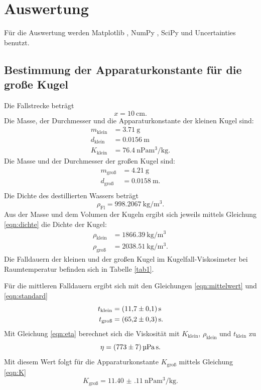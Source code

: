\section{Auswertung}
\label{sec:Auswertung}
Für die Auswertung werden Matplotlib \cite{matplotlib}, NumPy \cite{numpy}, SciPy \cite{scipy} 
und Uncertainties \cite{uncertainties} benutzt.

\subsection{Bestimmung der Apparaturkonstante für die große Kugel}
Die Fallstrecke beträgt 
\begin{equation*}
    x = \SI{10}{\centi\meter}.
\end{equation*}
Die Masse, der Durchmesser und die Apparaturkonstante der kleinen Kugel sind:
\begin{align*}
    m_\text{klein} &= \SI{3.71}{\gram} \\
    d_\text{klein} &= \SI{0.0156}{\meter} \\
    K_\text{klein} &= \SI{76.4}{\nano\pascal\cubic\meter\per\kilo\gram}.
\end{align*}
Die Masse und der Durchmesser der großen Kugel sind:
\begin{align*}
    m_\text{groß} &= \SI{4.21}{\gram} \\
    d_\text{groß} &= \SI{0.0158}{\meter}. \\
\end{align*}
Die Dichte des destillierten Wassers beträgt
\begin{equation*}
    \rho_\text{Fl} = \SI{998.2067}{\kilo\gram\per\cubic\meter}.
\end{equation*}
Aus der Masse und dem Volumen der Kugeln ergibt sich jeweils mittels Gleichung \eqref{eqn:dichte}
die Dichte der Kugel:
\begin{align*}
    \rho_\text{klein} &= \SI{1866.39}{\kilo\gram\per\cubic\meter} \\
    \rho_\text{groß} &= \SI{2038.51}{\kilo\gram\per\cubic\meter}.
\end{align*}
Die Falldauern der kleinen und der großen Kugel im Kugelfall-Viskosimeter
bei Raumtemperatur befinden sich in Tabelle \ref{tab1}.

\noindent Für die mittleren Falldauern ergibt sich mit den Gleichungen \eqref{eqn:mittelwert} 
und \eqref{eqn:standard}
\begin{align*}
    t_\text{klein} &= \SI{11.7 \pm 0.1}{\second} \\
    t_\text{groß} &= \SI{65.2 \pm 0.3}{\second}.
\end{align*}
Mit Gleichung \eqref{eqn:eta} berechnet sich die Viskosität mit $K_\text{klein}$,
$\rho_\text{klein}$ und $t_\text{klein}$ zu
\begin{equation*}
    \eta = \SI{773 \pm 7}{\micro\pascal\second}.
\end{equation*}
Mit diesem Wert folgt für die Apparaturkonstante $K_\text{groß}$
mittels Gleichung \eqref{eqn:K}
\begin{equation*}
    K_\text{groß} = \SI{11.40(11)}{\nano\pascal\cubic\meter\per\kilo\gram}.
\end{equation*}

